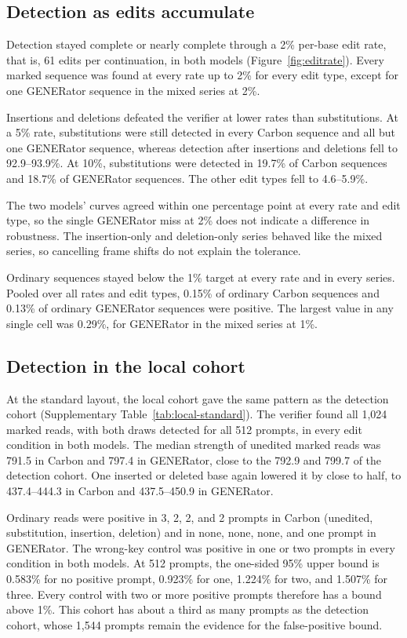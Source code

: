 \documentclass[10pt,twocolumn]{article}
\begin{document}
\subsection{Detection as edits accumulate}
\label{sec:edit-rate}

Detection stayed complete or nearly complete through a 2\% per-base edit rate, that is, 61 edits
per continuation, in both models (Figure~\ref{fig:editrate}). Every marked sequence was found at every
rate up to 2\% for every edit type, except for one GENERator sequence in the mixed series at 2\%.

Insertions and deletions defeated the verifier at lower rates than substitutions. At a 5\% rate,
substitutions were still detected in every Carbon sequence and all but one GENERator sequence, whereas
detection after insertions and deletions fell to 92.9--93.9\%. At 10\%, substitutions were
detected in 19.7\% of Carbon sequences and 18.7\% of GENERator sequences. The other edit types fell to
4.6--5.9\%.

The two models' curves agreed within one percentage point at every rate and edit type, so the
single GENERator miss at 2\% does not indicate a difference in robustness. The insertion-only and
deletion-only series behaved like the mixed series, so cancelling frame shifts do not explain the
tolerance.

Ordinary sequences stayed below the 1\% target at every rate and in every series. Pooled over all
rates and edit types, 0.15\% of ordinary Carbon sequences and 0.13\% of ordinary GENERator sequences were
positive. The largest value in any single cell was 0.29\%, for GENERator in the mixed series at
1\%.

\subsection{Detection in the local cohort}
\label{sec:local-cohort}

At the standard layout, the local cohort gave the same pattern as the detection cohort
(Supplementary Table~\ref{tab:local-standard}). The verifier found all 1{,}024 marked reads, with
both draws detected for all 512 prompts, in every edit condition in both models. The median strength
of unedited marked reads was 791.5 in Carbon and 797.4 in GENERator, close to the 792.9 and 799.7
of the detection cohort. One inserted or deleted base again lowered it by close to half, to
437.4--444.3 in Carbon and 437.5--450.9 in GENERator.

Ordinary reads were positive in 3, 2, 2, and 2 prompts in Carbon (unedited, substitution, insertion,
deletion) and in none, none, none, and one prompt in GENERator. The wrong-key control was positive
in one or two prompts in every condition in both models. At 512 prompts, the one-sided 95\% upper
bound is 0.583\% for no positive prompt, 0.923\% for one, 1.224\% for two, and 1.507\% for three.
Every control with two or more positive prompts therefore has a bound above 1\%. This cohort has about a third as many prompts as the detection cohort, whose 1{,}544
prompts remain the evidence for the false-positive bound.
\end{document}
